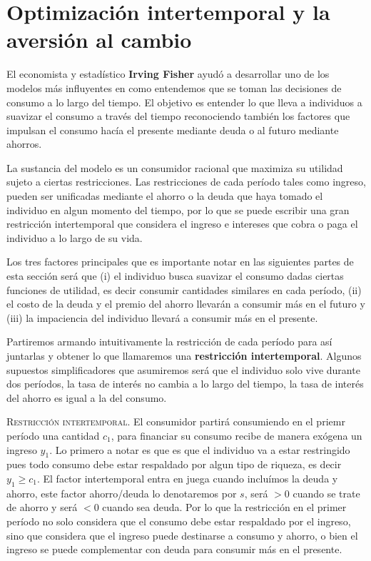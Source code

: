 \section{Optimización intertemporal y la aversión al cambio}
El economista y estadístico \textbf{Irving Fisher} ayudó a desarrollar uno de los modelos más influyentes en como entendemos que se toman las decisiones de consumo a lo largo del tiempo. El objetivo es entender lo que lleva a individuos a suavizar el consumo a través del tiempo reconociendo también los factores que impulsan el consumo hacía el presente mediante deuda o al futuro mediante ahorros.

La sustancia del modelo es un consumidor racional que maximiza su utilidad sujeto a ciertas restricciones. Las restricciones de cada período tales como ingreso, pueden ser unificadas mediante el ahorro o la deuda que haya tomado el individuo en algun momento del tiempo, por lo que se puede escribir una gran restricción intertemporal que considera el ingreso e intereses que cobra o paga el individuo a lo largo de su vida. 

Los tres factores principales que es importante notar en las siguientes partes de esta sección será que (i) el individuo busca suavizar el consumo dadas ciertas funciones de utilidad, es decir consumir cantidades similares en cada período, (ii) el costo de la deuda y el premio del ahorro llevarán a consumir más en el futuro y (iii) la impaciencia del individuo llevará a consumir más en el presente.

Partiremos armando intuitivamente la restricción de cada período para así juntarlas y obtener lo que llamaremos una \textbf{restricción intertemporal}. Algunos supuestos simplificadores que asumiremos será que el individuo solo vive durante dos períodos, la tasa de interés no cambia a lo largo del tiempo, la tasa de interés del ahorro es igual a la del consumo.

\textsc{Restricción intertemporal}. El consumidor partirá consumiendo en el priemr período una cantidad $c_1$, para financiar su consumo recibe de manera exógena un ingreso $y_1$. Lo primero a notar es que es que el individuo va a estar restringido pues todo consumo debe estar respaldado por algun tipo de riqueza, es decir $y_1 \geq c_1$. El factor intertemporal entra en juega cuando incluímos la deuda y ahorro, este factor ahorro/deuda lo denotaremos por $s$, será $>0$ cuando se trate de ahorro y será $<0$ cuando sea deuda. Por lo que la restricción en el primer período no solo considera que el consumo debe estar respaldado por el ingreso, sino que considera que el ingreso puede destinarse a consumo y ahorro, o bien el ingreso se puede complementar con deuda para consumir más en el presente.

